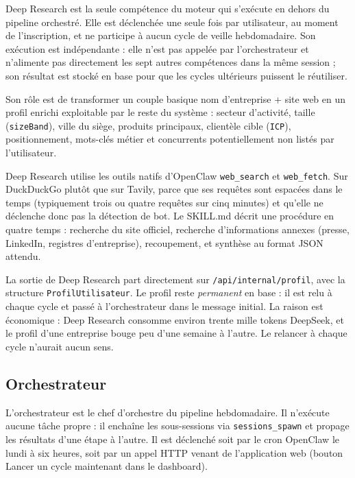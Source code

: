 \documentclass[12pt,a4paper,openany]{report}
\begin{document}
Deep Research est la seule compétence du moteur qui s'exécute en dehors du pipeline orchestré. Elle est déclenchée une seule fois par utilisateur, au moment de l'inscription, et ne participe à aucun cycle de veille hebdomadaire. Son exécution est indépendante : elle n'est pas appelée par l'orchestrateur et n'alimente pas directement les sept autres compétences dans la même session ; son résultat est stocké en base pour que les cycles ultérieurs puissent le réutiliser.

Son rôle est de transformer un couple basique \og nom d'entreprise + site web \fg{} en un profil enrichi exploitable par le reste du système : secteur d'activité, taille (\texttt{sizeBand}), ville du siège, produits principaux, clientèle cible (\texttt{ICP}), positionnement, mots-clés métier et concurrents potentiellement non listés par l'utilisateur.

Deep Research utilise les outils natifs d'OpenClaw \texttt{web\_search} et \texttt{web\_fetch}. Sur DuckDuckGo plutôt que sur Tavily, parce que ses requêtes sont espacées dans le temps (typiquement trois ou quatre requêtes sur cinq minutes) et qu'elle ne déclenche donc pas la détection de bot. Le SKILL.md décrit une procédure en quatre temps : recherche du site officiel, recherche d'informations annexes (presse, LinkedIn, registres d'entreprise), recoupement, et synthèse au format JSON attendu.

La sortie de Deep Research part directement sur \texttt{/api/internal/profil}, avec la structure \texttt{ProfilUtilisateur}. Le profil reste \emph{permanent} en base : il est relu à chaque cycle et passé à l'orchestrateur dans le message initial. La raison est économique : Deep Research consomme environ trente mille tokens DeepSeek, et le profil d'une entreprise bouge peu d'une semaine à l'autre. Le relancer à chaque cycle n'aurait aucun sens.

\subsection{Orchestrateur}
\label{sec:skill-orchestrateur}

L'orchestrateur est le chef d'orchestre du pipeline hebdomadaire. Il n'exécute aucune tâche propre : il enchaîne les sous-sessions via \texttt{sessions\_spawn} et propage les résultats d'une étape à l'autre. Il est déclenché soit par le cron OpenClaw le lundi à six heures, soit par un appel HTTP venant de l'application web (bouton \og Lancer un cycle maintenant \fg{} dans le dashboard).
\end{document}
